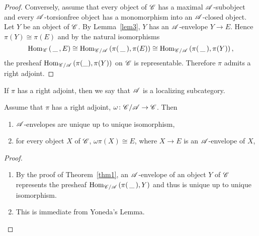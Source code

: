 \documentclass[dissertation.tex]{subfiles}
\begin{document}
\begin{thm}
\begin{proof}
    Conversely, assume that every object of $\mathscr{C}$ has a maximal $\mathscr{A}$-subobject and every $\mathscr{A}$-torsionfree object has a monomorphism into an $\mathscr{A}$-closed object.
    Let $Y$ be an object of $\mathscr{C}$.
    By Lemma~\ref{lem3}, $Y$ has an $\mathscr{A}$-envelope $Y \rightarrow E$.
    Hence $\pi(Y) \cong \pi(E)$ and by the natural isomorphisms
    $$\operatorname{Hom}_{\mathscr{C}}\left(\,\_\, , E\right) \cong \operatorname{Hom}_{\mathscr{C}/\mathscr{A}}\left(\pi(\,\_\,), \pi(E)\right) \cong \operatorname{Hom}_{\mathscr{C}/\mathscr{A}}\left(\pi(\,\_\,), \pi(Y)\right),$$
    the presheaf $\operatorname{Hom}_{\mathscr{C}/\mathscr{A}}\left(\pi(\_), \pi(Y)\right)$ on $\mathscr{C}$ is representable.
    Therefore $\pi$ admits a right adjoint.
  \end{proof}
\end{thm}

\begin{defn}
  If $\pi$ has a right adjoint, then we say that $\mathscr{A}$ is a localizing subcategory.
\end{defn}

\begin{cor}\label{cor1}
  Assume that $\pi$ has a right adjoint, $\omega \colon \mathscr{C}/\mathscr{A} \rightarrow \mathscr{C}$.
  Then 
  \begin{enumerate}
  \item
    $\mathscr{A}$-envelopes are unique up to unique isomorphism,
  \item
    for every object $X$ of $\mathscr{C}$, $\omega\pi(X) \cong E$, where $X \rightarrow E$ is an $\mathscr{A}$-envelope of $X$,
  \end{enumerate}
  \begin{proof}
    \begin{enumerate}
    \item
      By the proof of Theorem~\ref{thm1}, an $\mathscr{A}$-envelope of an object $Y$ of $\mathscr{C}$ represents the presheaf $\operatorname{Hom}_{\mathscr{C}/\mathscr{A}}\left(\pi(\,\_\,), Y\right)$ and thus is unique up to unique isomorphism.
    \item
      This is immediate from Yoneda's Lemma.
    \end{enumerate}
  \end{proof}
\end{cor}
\end{document}
